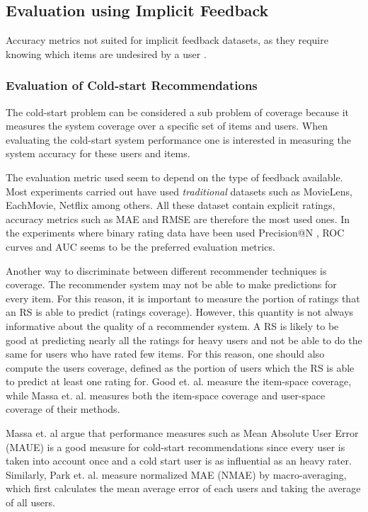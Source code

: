 \subsection{Evaluation using Implicit Feedback}

Accuracy metrics not suited for implicit feedback datasets, as they require knowing which items are undesired by a user \cite{Hu2008}.

\subsubsection{Evaluation of Cold-start Recommendations}

The cold-start problem can be considered a sub problem of coverage because it measures the system coverage over a specific set of items and users. When evaluating the cold-start system performance one is interested in measuring the system accuracy for these users and items.

The evaluation metric used seem to depend on the type of feedback available. Most experiments carried out have used \emph{traditional} datasets such as MovieLens, EachMovie, Netflix among others. All these dataset contain explicit ratings, accuracy metrics such as MAE \cite{Rashid2002, Rashid 2008, Massa2004, Massa2007, Stern2009} and RMSE \cite{Agarwal2009, Agarwal2010} are therefore the most used ones. In the experiments where binary rating data have been used Precision@N \cite{Liu2011, Ganter2010}, ROC curves \cite{Agarwal2009, Ganter2010, Schein2002} and AUC \cite{Liu2011, Ganter2010} seems to be the preferred evaluation metrics.

Another way to discriminate between different recommender techniques is coverage. The recommender system may not be able to make predictions for every item. For this reason, it is important to measure the portion of ratings that an RS is able to predict (ratings coverage). However, this quantity is not always informative about the quality of a recommender system. A RS is likely to be good at predicting nearly all the ratings for heavy users and not be able to do the same for users who have rated few items. For this reason, one should also compute the users coverage, defined as the portion of users which the RS is able to predict at least one rating for. Good et. al. \cite{Good1999} measure the item-space coverage, while Massa et. al. \cite{Massa2004, Massa2007} measures both the item-space coverage and user-space coverage of their methods.

Massa et. al \cite{Massa2004} argue that performance measures such as Mean Absolute User Error (MAUE) is a good measure for cold-start recommendations since every user is taken into account once and a cold start user is as influential as an heavy rater. Similarly, Park et. al. \cite{Park2006} measure normalized MAE (NMAE) by macro-averaging, which first calculates the mean average error of each users and taking the average of all users.

